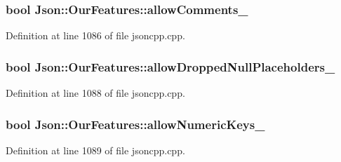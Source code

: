 \subsubsection[{\texorpdfstring{allow\+Comments\+\_\+}{allowComments_}}]{\setlength{\rightskip}{0pt plus 5cm}bool Json\+::\+Our\+Features\+::allow\+Comments\+\_\+}\hypertarget{class_json_1_1_our_features_ac71bb7ba7363d3b05ed76602b036ce33}{}\label{class_json_1_1_our_features_ac71bb7ba7363d3b05ed76602b036ce33}


Definition at line 1086 of file jsoncpp.\+cpp.

\subsubsection[{\texorpdfstring{allow\+Dropped\+Null\+Placeholders\+\_\+}{allowDroppedNullPlaceholders_}}]{\setlength{\rightskip}{0pt plus 5cm}bool Json\+::\+Our\+Features\+::allow\+Dropped\+Null\+Placeholders\+\_\+}\hypertarget{class_json_1_1_our_features_a13963bc44bf948eec1968f7ff8e8f5f1}{}\label{class_json_1_1_our_features_a13963bc44bf948eec1968f7ff8e8f5f1}


Definition at line 1088 of file jsoncpp.\+cpp.

\subsubsection[{\texorpdfstring{allow\+Numeric\+Keys\+\_\+}{allowNumericKeys_}}]{\setlength{\rightskip}{0pt plus 5cm}bool Json\+::\+Our\+Features\+::allow\+Numeric\+Keys\+\_\+}\hypertarget{class_json_1_1_our_features_af6973fc7e774ce2d634ba99442aeb91a}{}\label{class_json_1_1_our_features_af6973fc7e774ce2d634ba99442aeb91a}


Definition at line 1089 of file jsoncpp.\+cpp.

